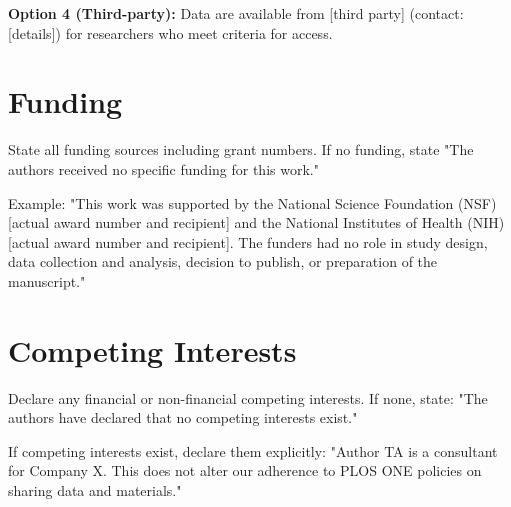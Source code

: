 \documentclass[10pt,letterpaper]{article}
\begin{document}
\textbf{Option 4 (Third-party):}
Data are available from [third party] (contact: [details]) for researchers who meet criteria for access.

\section*{Funding}

State all funding sources including grant numbers. If no funding, state "The authors received no specific funding for this work."

Example: "This work was supported by the National Science Foundation (NSF) [actual award number and recipient] and the National Institutes of Health (NIH) [actual award number and recipient]. The funders had no role in study design, data collection and analysis, decision to publish, or preparation of the manuscript."

\section*{Competing Interests}

Declare any financial or non-financial competing interests. If none, state: "The authors have declared that no competing interests exist."

If competing interests exist, declare them explicitly: "Author TA is a consultant for Company X. This does not alter our adherence to PLOS ONE policies on sharing data and materials."
\end{document}
